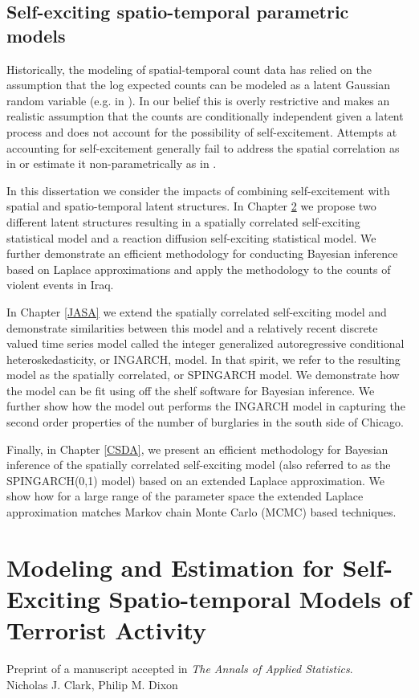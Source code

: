 \documentclass[11pt]{isuthesis}
\begin{document}
\section{Self-exciting spatio-temporal parametric models}

Historically, the modeling of spatial-temporal count data has relied on the assumption that the log expected counts can be modeled as a latent Gaussian random variable (e.g. in \cite{python2016bayesian}).  In our belief this is overly restrictive and makes an realistic assumption that the counts are conditionally independent given a latent process and does not account for the possibility of self-excitement.  Attempts at accounting for self-excitement generally fail to address the spatial correlation as in \cite{mohler2013modeling} or estimate it non-parametrically as in \cite{mohler2011self}.  

In this dissertation we consider the impacts of combining self-excitement with spatial and spatio-temporal latent structures.  In Chapter \ref{AoAS} we propose two different latent structures resulting in a spatially correlated self-exciting statistical model and a reaction diffusion self-exciting statistical model.  We further demonstrate an efficient methodology for conducting Bayesian inference based on Laplace approximations and apply the methodology to the counts of violent events in Iraq.

In Chapter \ref{JASA} we extend the spatially correlated self-exciting model and demonstrate similarities between this model and a relatively recent discrete valued time series model called the integer generalized autoregressive conditional heteroskedasticity, or INGARCH, model.  In that spirit, we refer to the resulting model as the spatially correlated, or SPINGARCH model.  We demonstrate how the model can be fit using off the shelf software for Bayesian inference.  We further show how the model out performs the INGARCH model in capturing the second order properties of the number of burglaries in the south side of Chicago.

Finally, in Chapter \ref{CSDA}, we present an efficient methodology for Bayesian inference of the spatially correlated self-exciting model (also referred to as the SPINGARCH(0,1) model) based on an extended Laplace approximation.  We show how for a large range of the parameter space the extended Laplace approximation matches Markov chain Monte Carlo (MCMC) based techniques.  



\chapter{Modeling and Estimation for Self-Exciting Spatio-temporal Models of Terrorist Activity}\label{AoAS}
\begin{center}
	Preprint of a manuscript accepted in \textit{The Annals of Applied Statistics}.\\
	Nicholas J. Clark, Philip M. Dixon
\end{center}
\end{document}
